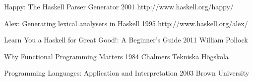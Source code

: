 
\begingroup
\renewcommand{\section}[2]{}%

\begin{thebibliography}{99}

  {Happy: The Haskell Parser Generator}
  {2001}
  {http://www.haskell.org/happy/}

  {Alex: Generating lexical analysers in Haskell}
  {1995}
  {http://www.haskell.org/alex/}

  {Learn You a Haskell for Great Good!: A Beginner's Guide}
  {2011}
  {William Pollock}

  {Why Functional Programming Matters}
  {1984}
  {Chalmers Tekniska Högskola}

  {Programming Languages: Application and Interpretation}
  {2003}
  {Brown University}

\end{thebibliography}

\endgroup